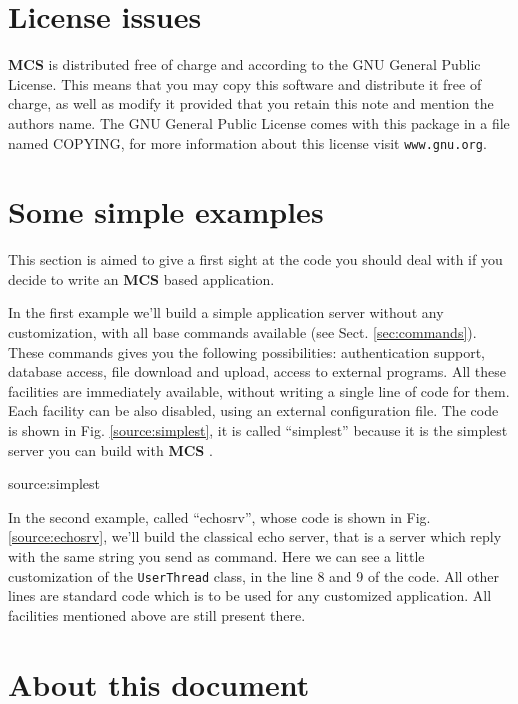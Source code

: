 \documentclass[12pt,titlepage]{book}
\newcommand{\mcs}{\textbf{MCS} }
\begin{document}
\section{License issues}
\label{sec-license}
\mcs is distributed free of charge and according to the GNU General
Public License. This means that you may copy this software and
distribute it free of charge, as well as modify it provided that you
retain this note and mention the authors name. The GNU General Public
License comes with this package in a file named COPYING, for more
information about this license visit \verb|www.gnu.org|.



\section{Some simple examples}
\label{sec-somesimpleexamples}
This section is aimed to give a first sight at the code you should
deal with if you decide to write an \mcs based application.

\bigskip

\noindent In the first example we'll build a simple application server
without any customization, with all base commands available (see
Sect. \ref{sec:commands}). These commands gives you the following
possibilities: authentication support, database access, file download
and upload, access to external programs. All these facilities are
immediately available, without writing a single line of code for
them. Each facility can be also disabled, using an external
configuration file. The code is shown in Fig. \ref{source:simplest},
it is called ``simplest'' because it is the simplest server you can
build with \mcs.

{source:simplest}

\bigskip

\noindent In the second example, called ``echosrv'', whose code is
shown in Fig. \ref{source:echosrv}, we'll build the classical echo
server, that is a server which reply with the same string you send as
command. Here we can see a little customization of the
\verb|UserThread| class, in the line 8 and 9 of the code. All other
lines are standard code which is to be used for any customized
application. All facilities mentioned above are still present there.



\section{About this document}
\label{sec:aboutthisdocument}
\end{document}
